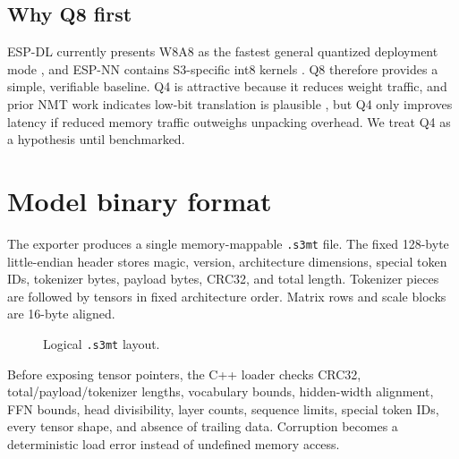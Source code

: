 \documentclass{article}
\begin{document}
\subsection{Why Q8 first}
ESP-DL currently presents W8A8 as the fastest general quantized deployment mode \citep{espressif_espdl}, and ESP-NN contains S3-specific int8 kernels \citep{espressif_espnn}. Q8 therefore provides a simple, verifiable baseline. Q4 is attractive because it reduces weight traffic, and prior NMT work indicates low-bit translation is plausible \citep{aji2019fourbit}, but Q4 only improves latency if reduced memory traffic outweighs unpacking overhead. We treat Q4 as a hypothesis until benchmarked.

\section{Model binary format}
The exporter produces a single memory-mappable \texttt{.s3mt} file. The fixed 128-byte little-endian header stores magic, version, architecture dimensions, special token IDs, tokenizer bytes, payload bytes, CRC32, and total length. Tokenizer pieces are followed by tensors in fixed architecture order. Matrix rows and scale blocks are 16-byte aligned.

\begin{figure}[t]
\centering
{}
\caption{Logical \texttt{.s3mt} layout.}
\end{figure}

Before exposing tensor pointers, the C++ loader checks CRC32, total/payload/tokenizer lengths, vocabulary bounds, hidden-width alignment, FFN bounds, head divisibility, layer counts, sequence limits, special token IDs, every tensor shape, and absence of trailing data. Corruption becomes a deterministic load error instead of undefined memory access.
\end{document}
